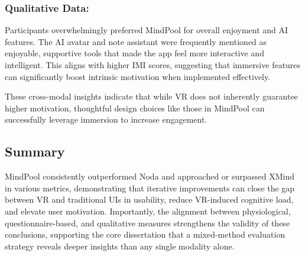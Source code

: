 \documentclass{CPP}
\begin{document}
\subsubsection{Qualitative Data:}
 Participants overwhelmingly preferred MindPool for overall enjoyment and AI features. The AI avatar and note assistant were frequently mentioned as enjoyable, supportive tools that made the app feel more interactive and intelligent. This aligns with higher IMI scores, suggesting that immersive features can significantly boost intrinsic motivation when implemented effectively.

These cross-modal insights indicate that while VR does not inherently guarantee higher motivation, thoughtful design choices like those in MindPool can successfully leverage immersion to increase engagement.

\subsection{Summary}

MindPool consistently outperformed Noda and approached or surpassed XMind in various metrics, demonstrating that iterative improvements can close the gap between VR and traditional UIs in usability, reduce VR-induced cognitive load, and elevate user motivation. Importantly, the alignment between physiological, questionnaire-based, and qualitative measures strengthens the validity of these conclusions, supporting the core dissertation that a mixed-method evaluation strategy reveals deeper insights than any single modality alone.






    
\end{document}
